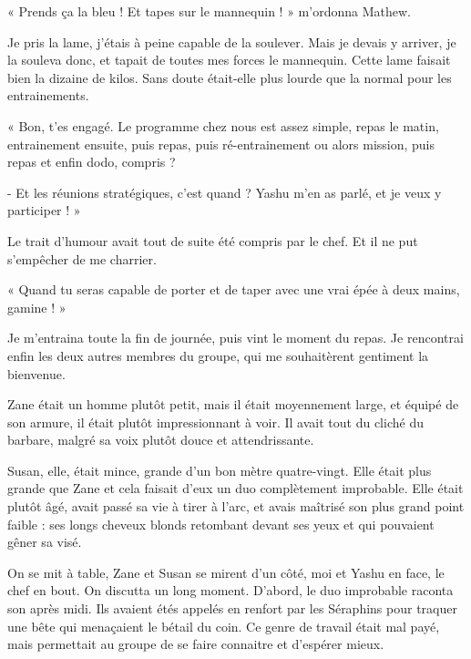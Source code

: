 \documentclass{book}
\begin{document}
« Prends ça la bleu ! Et tapes sur le mannequin ! » m'ordonna Mathew.\newline

Je pris la lame, j'étais à peine capable de la soulever. Mais je devais y arriver, je la souleva donc, et tapait de toutes mes forces le mannequin. Cette lame faisait bien la dizaine de kilos. Sans doute était-elle plus lourde que la normal pour les entrainements.\newline

« Bon, t'es engagé. Le programme chez nous est assez simple, repas le matin, entrainement ensuite, puis repas, puis ré-entrainement ou alors mission, puis repas et enfin dodo, compris ?

- Et les réunions stratégiques, c'est quand ? Yashu m'en as parlé, et je veux y participer ! »\newline

Le trait d'humour avait tout de suite été compris par le chef. Et il ne put s'empêcher de me charrier.

« Quand tu seras capable de porter et de taper avec une vrai épée à deux mains, gamine ! »\newline

Je m'entraina toute la fin de journée, puis vint le moment du repas. Je rencontrai enfin les deux autres membres du groupe, qui me souhaitèrent gentiment la bienvenue.\newline

Zane était un homme plutôt petit, mais il était moyennement large, et équipé de son armure, il était plutôt impressionnant à voir. Il avait tout du cliché du barbare, malgré sa voix plutôt douce et attendrissante.\newline

Susan, elle, était mince, grande d'un bon mètre quatre-vingt. Elle était plus grande que Zane et cela faisait d'eux un duo complètement improbable. Elle était plutôt âgé, avait passé sa vie à tirer à l'arc, et avais maîtrisé son plus grand point faible : ses longs cheveux blonds retombant devant ses yeux et qui pouvaient gêner sa visé.\newline

On se mit à table, Zane et Susan se mirent d'un côté, moi et Yashu en face, le chef en bout. On discutta un long moment. D'abord, le duo improbable raconta son après midi. Ils avaient étés appelés en renfort par les Séraphins pour traquer une bête qui menaçaient le bétail du coin. Ce genre de travail était mal payé, mais permettait au groupe de se faire connaitre et d'espérer mieux.\newline
\end{document}
